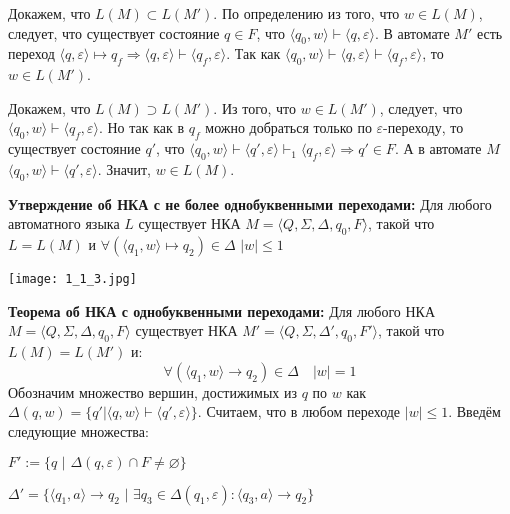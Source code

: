 Докажем, что $L(M) \subset L (M')$. По определению из того, что $w \in L (M)$, следует, что существует состояние $q \in F$, что $\langle q_0, w \rangle \vdash \langle q, \varepsilon \rangle$. В автомате $M'$ есть переход $\langle q, \varepsilon \rangle \mapsto q_f \Longrightarrow \langle q, \varepsilon \rangle \vdash \langle q_f, \varepsilon \rangle$. Так как $\langle q_0, w \rangle \vdash \langle q, \varepsilon \rangle \vdash \langle q_f, \varepsilon \rangle$, то $w \in L (M')$.
\begin{figure}[h]
    \hspace{-4ex} \begin{minipage}[h]{1\linewidth}
    \end{minipage}
    \hspace{-4ex}
\end{figure}

Докажем, что $L (M) \supset L (M')$. Из того, что $w \in L (M')$, следует, что $\langle q_0, w \rangle \vdash \langle q_f, \varepsilon \rangle$. Но так как в $q_f$ можно добраться только по $\varepsilon$-переходу, то существует состояние $q'$, что $\langle q_0, w \rangle \vdash \langle q', \varepsilon \rangle \vdash_1 \langle q_f, \varepsilon \rangle \Longrightarrow q' \in F$. А в автомате $M$ $\langle q_0, w \rangle \vdash \langle q', \varepsilon \rangle$. Значит, $w \in L(M)$. \EndProof

\textbf{Утверждение об НКА с не более однобуквенными переходами:} Для любого автоматного языка $L$ существует НКА $M = \langle Q, \Sigma, \Delta, q_0, F \rangle$, такой что $L = L(M)$ и $\forall (\langle q_1, w \rangle \mapsto q_2) \in \Delta$ $|w| \leqslant 1$

\begin{center}
\texttt{[image: 1\_1\_3.jpg]}
\end{center}

\textbf{Теорема об НКА с однобуквенными переходами:} Для любого НКА $M = \langle Q, \Sigma, \Delta, q_0, F \rangle$ существует НКА $M' = \langle Q, \Sigma, \Delta', q_0, F' \rangle$, такой что $L (M) = L (M')$ и:
$$\forall (\langle q_1, w \rangle \rightarrow q_2) \in \Delta \quad |w| = 1$$
\Proof Обозначим множество вершин, достижимых из $q$ по $w$ как $\Delta (q, w) = \{ q' | \langle q, w \rangle \vdash \langle q', \varepsilon \rangle \}$. Считаем, что в любом переходе $|w| \leqslant 1$. Введём следующие множества:

\begin{center}
    $F' := \{ q \,\,|\,\, \Delta (q, \varepsilon) \cap F \neq \varnothing \}$
    
    $\Delta' = \{ \langle q_1, a \rangle \rightarrow q_2 \,\, |\,\, \exists q_3 \in \Delta (q_1, \varepsilon) : \langle q_3, a \rangle \rightarrow q_2 \}$
\end{center}


